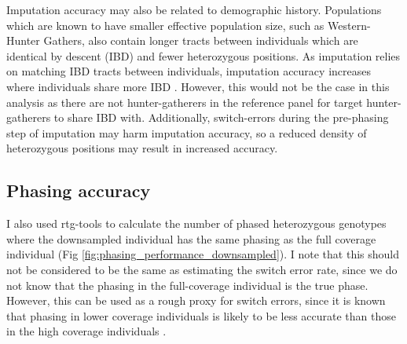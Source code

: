 Imputation accuracy may also be related to demographic history. Populations which are known to have smaller effective population size, such as Western-Hunter Gathers, also contain longer tracts between individuals which are identical by descent (IBD) \cite{browning2015accurate} and fewer heterozygous positions. As imputation relies on matching IBD tracts between individuals, imputation accuracy increases where individuals share more IBD \cite{kong2008detection}. However, this would not be the case in this analysis as there are not hunter-gatherers in the reference panel for target hunter-gatherers to share IBD with. Additionally, switch-errors during the pre-phasing step of imputation may harm imputation accuracy, so a reduced density of heterozygous positions may result in increased accuracy. 

\subsection{Phasing accuracy}

I also used rtg-tools to calculate the number of phased heterozygous genotypes where the downsampled individual has the same phasing as the full coverage individual (Fig \ref{fig:phasing_performance_downsampled}). I note that this should not be considered to be the same as estimating the switch error rate, since we do not know that the phasing in the full-coverage individual is the true phase. However, this can be used as a rough proxy for switch errors, since it is known that phasing in lower coverage individuals is likely to be less accurate than those in the high coverage individuals \cite{rubinacci2021efficient}.

